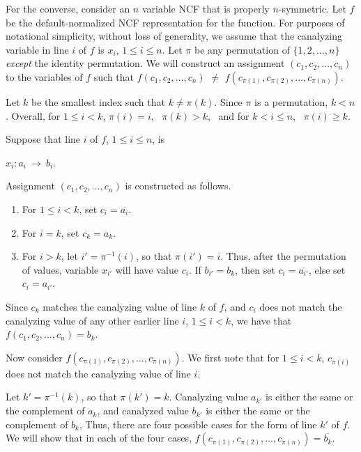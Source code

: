 For the converse, consider an $n$ variable NCF that is properly $n$-symmetric.
Let $f$ be the default-normalized NCF representation for the function.  For
purposes of notational simplicity, without loss of generality,
we assume that the canalyzing
variable in line $i$ of $f$ is $x_i$, $1 \leq i \leq n$.  Let $\pi$
be any permutation of $\{1, 2, \ldots, n\}$ \emph{except} the
identity permutation.  We will construct an assignment $(c_1, c_2,
\ldots,  c_n)$ to the variables of $f$ such that $f(c_1, c_2, \ldots,
c_n)$ $\neq$ $f(c_{\pi(1)}, c_{\pi(2)}, \ldots, c_{\pi(n)})$.

Let $k$ be the smallest index such that $k \neq \pi(k)$.  Since
$\pi$ is a permutation, $k < n$.  Overall, for $1 \leq i < k$,
$\pi(i) = i$,~ $\pi(k) > k$,~ and for $k < i \leq n$,~ $\pi(i) \geq k$.

\smallskip

Suppose that line $i$ of $f$, $1 \leq i \leq n$, is 

\smallskip

\hspace*{0.25in} $x_i : a_i ~\longrightarrow~ b_i$. 

\smallskip

\noindent
Assignment $(c_1, c_2, \ldots,  c_n)$ is constructed as follows.
\begin{enumerate}
\item For $1 \leq i < k$, set $c_i = \overline{a_i}$.  
\item For $i = k$, set $c_k =a_k$. 
\item For $i > k$, let $i' = \pi^{-1}(i)$, so that $\pi(i')
= i$.  Thus, after the permutation of values, variable $x_{i'}$
will have value $c_i$.  If $b_{i'} = b_k$, then set $c_i =
\overline{a_{i'}}$, else set $c_i =  a_{i'}$.
\end{enumerate}
Since $c_k$ matches the canalyzing value of line $k$ of $f$, and
$c_i$ does not match the canalyzing value of any other earlier line
$i$, $1 \leq i < k$, we have that $f(c_1, c_2, \ldots,  c_n) = b_k$.

Now consider $f(c_{\pi(1)}, c_{\pi(2)}, \ldots, c_{\pi(n)})$.  We
first note that for $1 \leq i < k$, $c_{\pi(i)}$ does not match the
canalyzing value of line $i$.

Let $k' = \pi^{-1}(k)$, so that $\pi(k') = k$.  Canalyzing value
$a_{k'}$ is either the same or the complement of $a_k$, and canalyzed
value $b_{k'}$ is either the same or the complement of $b_k$, Thus,
there are four possible cases for the form of line $k'$ of $f$.  We
will show that in each of the four cases, $f(c_{\pi(1)}, c_{\pi(2)},
\ldots, c_{\pi(n)}) = \overline{b_k}$.

